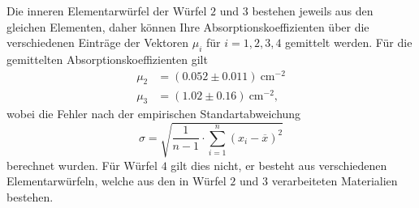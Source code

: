 \noindent Die inneren Elementarwürfel der Würfel $2$ und $3$ bestehen jeweils
aus den gleichen Elementen, daher können Ihre Absorptionskoeffizienten über die
verschiedenen Einträge der Vektoren $\mu_i$ für $i = 1, 2, 3, 4$ gemittelt
werden. Für die gemittelten Absorptionskoeffizienten gilt
\begin{align}
  \mu_2 &= (0.052  \pm  0.011) \: \si{\centi\metre^{-2}}\\
  \mu_3 &= (1.02   \pm  0.16)  \: \si{\centi\metre^{-2}},
\end{align}
wobei die Fehler nach der empirischen Standartabweichung
\begin{equation}
  \sigma = \sqrt{\frac{1}{n-1} \cdot \sum_{i=1}^n(x_i-\overline{x})^2}
  \label{eqn:Stdabweichung}
\end{equation}
\noindent berechnet wurden.
Für Würfel $4$ gilt dies nicht, er besteht aus verschiedenen
Elementarwürfeln, welche aus den in Würfel $2$ und $3$ verarbeiteten Materialien
bestehen.
